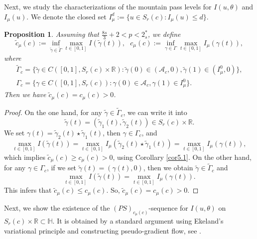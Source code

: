 \documentclass[11pt]{article}
\numberwithin{equation}{section}
\newtheorem{proposition}[theorem]{Proposition}
\begin{document}
Next, we study the characterizations of the mountain pass levels for 
$I(u,\theta)$ and $I_\mu(u)$. We denote the closed set
$I^d_\mu:=\{u\in  S_{r}(c):I_\mu(u)\leq d\}$.

\begin{proposition}\label{pro5.1} 
Assuming that  $\frac{8s}{3}+2<p< 2^*_s$,  we define
$$
\tilde{c}_\mu (c):=\inf_{\tilde{\gamma}\in \tilde{\Gamma}}\max_{t\in[0,1]}
I(\tilde{\gamma}(t)),~~~{c}_\mu (c):=\inf_{{\gamma}\in{\Gamma}}
\max_{t\in[0,1]}I_{\mu}({\gamma}(t)),
$$
where
\begin{gather*}
\tilde{\Gamma}_c=\{\tilde{\gamma}\in C([0,1],  S_{r}(c)\times \mathbb{R}): 
\tilde{\gamma}(0)\in (\mathcal{A}_c, 0), \tilde{\gamma}(1)\in (I^0_\mu, 0)\},\\
{\Gamma}_c=\{{\gamma}\in C([0,1],  S_{r}(c)): {\gamma}(0)\in \mathcal{A}_c,
 {\gamma}(1)\in I^0_\mu\}.
\end{gather*}
Then we have 
$\tilde{c}_\mu (c)={c}_\mu (c)>0$.
\end{proposition}

\begin{proof}
 On the one hand, for any $\tilde{\gamma}\in \tilde{\Gamma}_c$, we can write  it into 
$$
\tilde{\gamma}(t)=(\tilde{\gamma}_1(t), \tilde{\gamma}_2(t))\in S_r(c)\times \mathbb{R}.
$$
We set ${\gamma}(t)=\tilde{\gamma}_2(t)\star \tilde{\gamma}_1(t)$, then 
${\gamma}\in {\Gamma}_c$, and
$$
 \max_{t\in[0,1]} I(\tilde{\gamma}(t))=\max_{t\in[0,1]} I_\mu(\tilde{\gamma}_2(t)
 \star \tilde{\gamma}_1(t))=\max_{t\in[0,1] } I_\mu({\gamma}(t)),
$$
which implies $\tilde{c}_\mu (c)\geq {c}_\mu (c)>0$, using Corollary \ref{cor5.1}. 
On the other hand, for any ${\gamma}\in {\Gamma}_c$, if we set
$\tilde{\gamma}(t)= ({\gamma}(t), 0)$, then we obtain 
$\tilde{\gamma}\in \tilde{\Gamma}_c$ and
$$
\max_{t\in[0,1]} I(\tilde{\gamma}(t))
=\max_{t\in[0,1] } I_\mu({\gamma}(t)).
$$
This infers that  $\tilde{c}_\mu (c)\leq {c}_\mu (c)$. So,  
$\tilde{c}_\mu (c)= {c}_\mu (c)>0$.
\end{proof}

Next, we show the existence of the $(PS)_{{c}_\mu (c)}$-sequence for $I(u, \theta)$ 
on $ S_{r}(c)\times \mathbb{R}\subset \mathbb{H}$. 
It is obtained by a standard argument using Ekeland's variational principle and
constructing pseudo-gradient flow, see \cite[Proposition 2.2]{J7888}.
\end{document}
